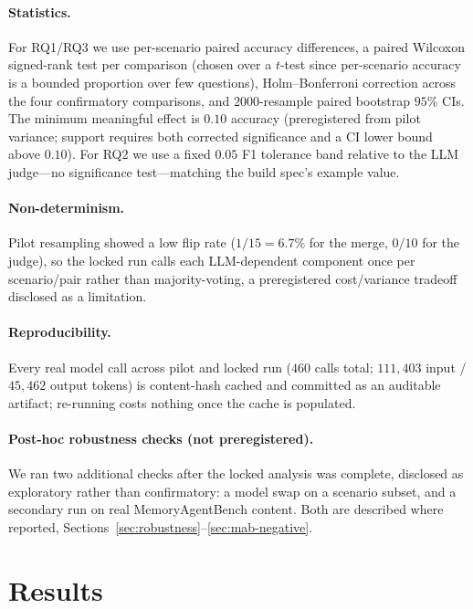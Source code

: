 \documentclass[11pt]{article}
\begin{document}
\paragraph{Statistics.} For RQ1/RQ3 we use per-scenario paired accuracy
differences, a paired Wilcoxon signed-rank test per comparison (chosen over
a $t$-test since per-scenario accuracy is a bounded proportion over few
questions), Holm--Bonferroni correction across the four confirmatory
comparisons, and $2000$-resample paired bootstrap $95\%$ CIs. The minimum
meaningful effect is $0.10$ accuracy (preregistered from pilot variance;
support requires both corrected significance and a CI lower bound above
$0.10$). For RQ2 we use a fixed $0.05$ F1 tolerance band relative to the
LLM judge---no significance test---matching the build spec's example value.

\paragraph{Non-determinism.} Pilot resampling showed a low flip rate
($1/15{=}6.7\%$ for the merge, $0/10$ for the judge), so the locked run calls
each LLM-dependent component once per scenario/pair rather than majority-voting,
a preregistered cost/variance tradeoff disclosed as a limitation.

\paragraph{Reproducibility.} Every real model call across pilot and locked run
($460$ calls total; $111{,}403$ input / $45{,}462$ output tokens) is
content-hash cached and committed as an auditable artifact; re-running costs
nothing once the cache is populated.

\paragraph{Post-hoc robustness checks (not preregistered).} We ran two
additional checks after the locked analysis was complete, disclosed as
exploratory rather than confirmatory: a model swap on a scenario subset, and
a secondary run on real MemoryAgentBench content. Both are described where
reported, Sections~\ref{sec:robustness}--\ref{sec:mab-negative}.

\section{Results}
\label{sec:results}
\end{document}
